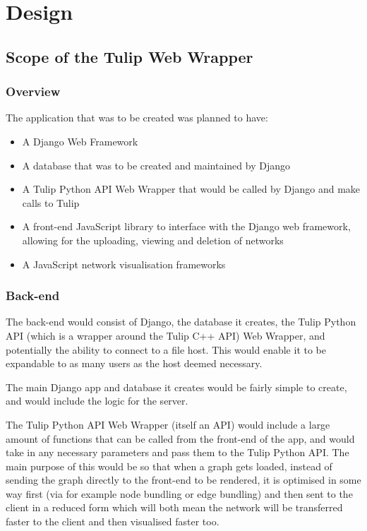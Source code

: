 \documentclass[../dissertation.tex]{subfiles}
\begin{document}
\chapter{Design}

\section{Scope of the Tulip Web Wrapper}
\label{sec:scope}

\subsection{Overview}

The application that was to be created was planned to have:

\begin{itemize}
    \item A Django Web Framework
    \item A database that was to be created and maintained by Django
    \item A Tulip Python API Web Wrapper that would be called by Django and make calls to Tulip
    \item A front-end JavaScript library to interface with the Django web framework, allowing for the uploading, viewing and deletion of networks
    \item A JavaScript network visualisation frameworks
\end{itemize}

\subsection{Back-end}

The back-end would consist of Django, the database it creates, the Tulip Python API (which is a wrapper around the Tulip C++ API) Web Wrapper, and potentially the ability to connect to a file host. This would enable it to be expandable to as many users as the host deemed necessary.

The main Django app and database it creates would be fairly simple to create, and would include the logic for the server.

The Tulip Python API Web Wrapper (itself an API) would include a large amount of functions that can be called from the front-end of the app, and would take in any necessary parameters and pass them to the Tulip Python API. The main purpose of this would be so that when a graph gets loaded, instead of sending the graph directly to the front-end to be rendered, it is optimised in some way first (via for example node bundling or edge bundling) and then sent to the client in a reduced form which will both mean the network will be transferred faster to the client and then visualised faster too. 
\end{document}

